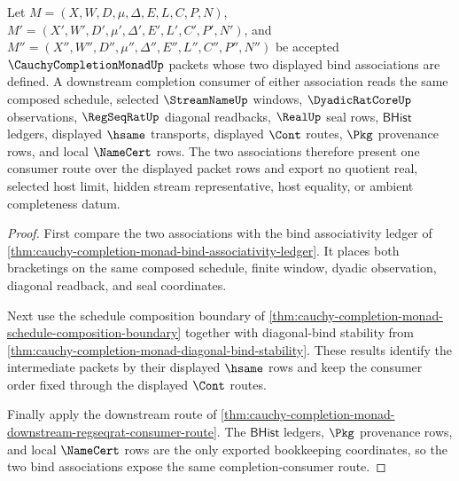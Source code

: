 \begin{theorem}
\label{thm:cauchy-completion-monad-associative-bind-consumer-route}
Let $M=(X,W,D,\mu,\Delta,E,L,C,P,N)$, $M'=(X',W',D',\mu',\Delta',E',L',C',P',N')$, and $M''=(X'',W'',D'',\mu'',\Delta'',E'',L'',C'',P'',N'')$ be accepted $\CauchyCompletionMonadUp$ packets whose two displayed bind associations are defined. A downstream completion consumer of either association reads the same composed schedule, selected $\StreamNameUp$ windows, $\DyadicRatCoreUp$ observations, $\RegSeqRatUp$ diagonal readbacks, $\RealUp$ seal rows, $\mathsf{BHist}$ ledgers, displayed $\hsame$ transports, displayed $\Cont$ routes, $\Pkg$ provenance rows, and local $\NameCert$ rows. The two associations therefore present one consumer route over the displayed packet rows and export no quotient real, selected host limit, hidden stream representative, host equality, or ambient completeness datum.
\end{theorem}
\begin{proof}
First compare the two associations with the bind associativity ledger of \autoref{thm:cauchy-completion-monad-bind-associativity-ledger}. It places both bracketings on the same composed schedule, finite window, dyadic observation, diagonal readback, and seal coordinates.

Next use the schedule composition boundary of \autoref{thm:cauchy-completion-monad-schedule-composition-boundary} together with diagonal-bind stability from \autoref{thm:cauchy-completion-monad-diagonal-bind-stability}. These results identify the intermediate packets by their displayed $\hsame$ rows and keep the consumer order fixed through the displayed $\Cont$ routes.

Finally apply the downstream route of \autoref{thm:cauchy-completion-monad-downstream-regseqrat-consumer-route}. The $\mathsf{BHist}$ ledgers, $\Pkg$ provenance rows, and local $\NameCert$ rows are the only exported bookkeeping coordinates, so the two bind associations expose the same completion-consumer route.
\end{proof}

